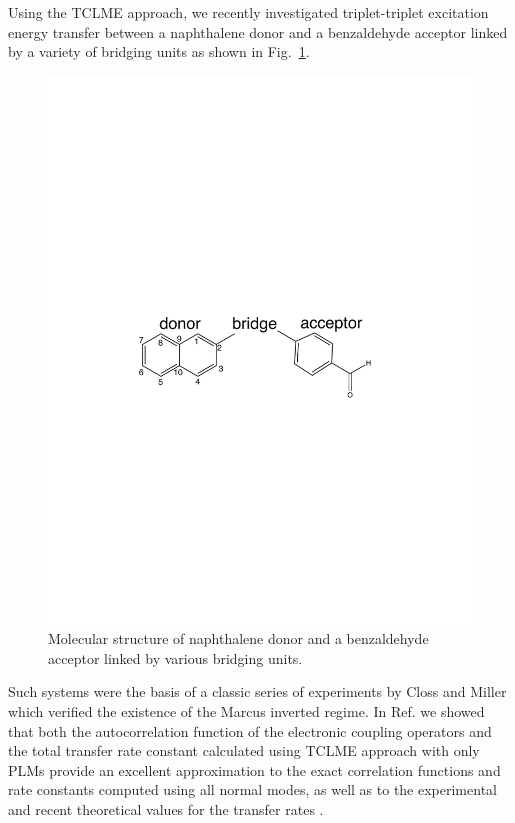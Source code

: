Using the TCLME approach,  we recently investigated
triplet-triplet excitation energy transfer between a naphthalene donor and a
benzaldehyde acceptor linked by a variety of bridging units as shown in Fig.~\ref{struct}. \cite{yang2014intramolecular}
\begin{figure}
\includegraphics[width=\columnwidth]{Chapters/chap3/molecule1.pdf}
\caption{Molecular structure of naphthalene donor and a
benzaldehyde acceptor linked by various bridging units. }\label{struct}
\end{figure}
Such systems were the basis of a  classic series of experiments by
Closs and Miller \cite{miller1984intramolecular,closs1988determination,closs1989connection}
which verified the existence of the Marcus inverted regime.
In Ref. \cite{yang2014intramolecular} we showed that both
the autocorrelation function of the electronic coupling operators
and the total transfer rate constant calculated using TCLME approach with only PLMs provide an
excellent approximation to the exact correlation functions and rate
constants computed using all normal modes, as well as to the experimental
and recent theoretical values for the transfer rates \cite{subotnik2010predicting}.

